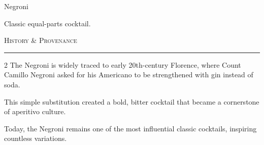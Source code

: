 \documentclass[4x6]{recipe-card}
\begin{document}
\begin{recipe}{Negroni}
\noindent\begin{minipage}{\textwidth}
\small\raggedright
{}\quad
{}\quad
\end{minipage}\par\vspace{6pt}
\begin{ingredients}
\end{ingredients}
\begin{process}
\end{process}

\vfill
\begin{recipeinfo}
    Classic equal-parts cocktail.
\end{recipeinfo}

\back
\drawBackMirrorSpiritBar
\begin{center}
    \footnotesize\textsc{\color{recipeRed} History \& Provenance}
    \vspace{-3pt}
    \rule{0.92\textwidth}{0.35pt}
\end{center}
\vspace{-5pt}
\begin{multicols*}{2}
\scriptsize
\setlength{\columnsep}{9pt}
The Negroni is widely traced to early 20th-century Florence, where Count Camillo Negroni asked for his Americano to be strengthened with gin instead of soda.
\par
This simple substitution created a bold, bitter cocktail that became a cornerstone of aperitivo culture.
\par
Today, the Negroni remains one of the most influential classic cocktails, inspiring countless variations.
\vspace{2pt}
\begin{flushright}
\end{flushright}
\end{multicols*}

\end{recipe}
\end{document}
